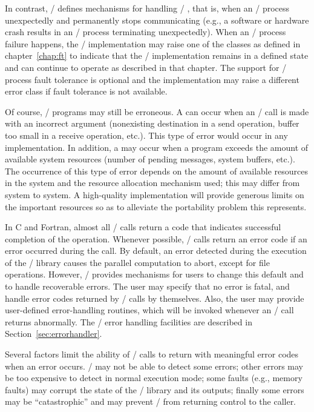 In contrast, \MPI/ defines mechanisms for
handling \MPI/ ,
that is, when an \MPI/ process unexpectedly and permanently stops communicating
(e.g., a software or hardware crash results in an \MPI/ process terminating unexpectedly).
When an \MPI/ process failure happens, the \MPI/ implementation may raise one of the
classes as defined in chapter~\ref{chap:ft} to indicate that the \MPI/ implementation
remains in a defined state and can continue to operate as described in that chapter.
The support for \MPI/ process fault tolerance is optional and the implementation may raise a different
error class if fault tolerance is not available.

Of course, \MPI/ programs may still be erroneous.  A  can
occur when an \MPI/ call is made with an incorrect argument (nonexisting
destination in a send operation, buffer too small in a receive
operation, etc.).
This type of error would occur in any implementation.
In addition, a  may occur when a program exceeds the amount
of available system resources (number of pending messages, system buffers,
etc.).   The occurrence of this type of error depends on the amount of
available resources in the system and the resource allocation mechanism used;
this may differ from system to system.   A high-quality
implementation will provide generous limits on the important
resources so as to alleviate the portability problem this
represents.

In C and Fortran, almost all \MPI/ calls return a code that indicates
successful completion of the operation.  Whenever possible, \MPI/
calls return an error code if an error occurred during the call.  By
default, an error detected during the execution of the \MPI/ library
causes the parallel computation to abort,
except for file operations.
However, \MPI/ provides
mechanisms for users to change this default and to handle recoverable
errors.  The user may specify that no error is fatal, and handle error
codes returned by \MPI/ calls by themselves.  Also, the user
may provide user-defined error-handling routines, which will be
invoked whenever an \MPI/ call returns abnormally.  The \MPI/ error
handling facilities are described
in Section~\ref{sec:errorhandler}.

Several factors limit the ability of \MPI/ calls to return with meaningful error
codes when an error occurs.
\MPI/ may not be able to detect some errors;  other errors may be too
expensive to detect in normal execution mode;  some faults (e.g., memory faults)
may corrupt the state of the \MPI/ library and its outputs; finally some errors may be
``catastrophic'' and may prevent \MPI/ from returning control to the caller.

